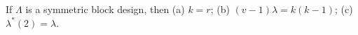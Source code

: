 If $\Lambda$ is a symmetric block design, then
(a) $k = r$;
(b) $(v - 1)\lambda = k(k - 1)$;
(c) $\lambda^*(2) = \lambda$.

